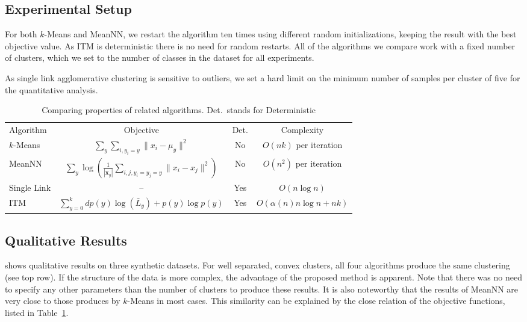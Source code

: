 \subsection{Experimental Setup}
For both $k$-Means and MeanNN, we restart the algorithm ten times using
different random initializations, keeping the result with the best objective
value. As ITM is deterministic there is no need for random restarts.  All of
the algorithms we compare work with a fixed number of clusters, which we set to
the number of classes in the dataset for all experiments.

As single link agglomerative clustering is sensitive to outliers, we set
a hard limit on the minimum number of samples per cluster of five for
the quantitative analysis.

\begin{table}[t]
\centering
\begin{tabularx}{\linewidth}{@{\extracolsep{\fill}}lccc}
\toprule
Algorithm &     Objective &     Det.&      Complexity \\
\cmidrule{1-4}
$k$-Means &     $\displaystyle \sum_y \sum_{i, y_i = y} \| x_i - \mu_y \|^2$ & No  & $O(nk)$ per iteration%
\\
MeanNN &    $\displaystyle \sum_y \log\left(\frac{1}{|\mathbf{x}_y|}\sum_{i,j, y_i=y_j=y} \| x_i - x_j \|^2 \right)$ & No & $O(n^2)$ per iteration\\
Single Link &   -- &    Yes    &    $O(n\log n)$\\
ITM & $\displaystyle \sum_{y=0}^k d p(y) \log(\bar{L}_y  ) + p(y) \log{p(y)}$ & Yes & $O(\alpha(n) n \log n + nk)$\\
\bottomrule
\end{tabularx}
\caption{Comparing properties of related algorithms. Det.\ stands for Deterministic}\label{nowotab}
\end{table}


\subsection{Qualitative Results}
 shows qualitative results on three synthetic datasets.
For well separated, convex clusters, all four algorithms produce the same
clustering (see top row).  If the structure of the data is more complex, the
advantage of the proposed method is apparent.  Note that there was no need to
specify any other parameters than the number of clusters to produce these
results.  It is also noteworthy that the results of MeanNN are very close to
those produces by $k$-Means in most cases. This similarity can be explained
by the close relation of the objective functions, listed in Table~\ref{nowotab}.

